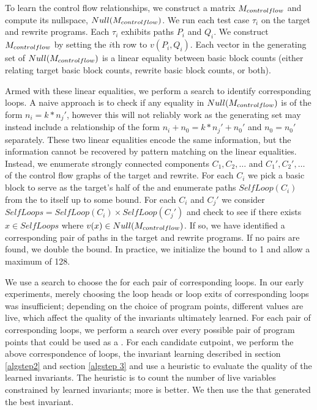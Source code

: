 To learn the control flow relationships, we construct a
matrix $M_{controlflow}$ and compute its nullspace,
$Null(M_{controlflow})$. We run each test case $\tau_i$ on
the target and rewrite programs. Each $\tau_i$ exhibits paths
$P_i$ and $Q_i$. We construct $M_{controlflow}$ by setting the
$i$th row to $v(P_i, Q_i)$. Each vector in the generating set of
$Null(M_{controlflow})$ is a linear equality between basic block
counts (either relating target basic block counts, rewrite basic block
counts, or both).

Armed with these linear equalities, we perform a search to identify
corresponding loops. A naive approach is to check if any equality
in $Null(M_{controlflow})$ is of the form $n_i = k*n_j'$,
however this will not reliably work as the generating set may instead
include a relationship of the form $n_i + n_0 = k*n_j' + n_0'$ and
$n_0 = n_0'$ separately. These two linear equalities encode the same
information, but the information cannot be recovered by pattern
matching on the linear equalities. Instead, we enumerate strongly
connected components $C_1, C_2, \dotsc$ and $C_1', C_2', \dotsc$ of
the control flow graphs of the target and rewrite. For each $C_i$ we
pick a basic block to serve as the target's half of the \cutpoint{}
and enumerate paths $SelfLoop(C_i)$ from the \cutpoint{} to itself
up to some bound. For each $C_i$ and $C_j'$ we consider $SelfLoops =
SelfLoop(C_i) \times SelfLoop(C_j')$ and check to see if there exists
$x \in SelfLoops$ where $v(x) \in Null(M_{controlflow})$. If
so, we have identified a corresponding pair of paths in the target
and rewrite programs. If no pairs are found, we double the bound. In
practice, we initialize the bound to 1 and allow a maximum of 128.

We use a search to choose the \cutpoint{} for each pair of
corresponding loops. In our early experiments, merely choosing the
loop heads or loop exits of corresponding loops was insufficient;
depending on the choice of program points, different values are live,
which affect the quality of the invariants ultimately learned. For
each pair of corresponding loops, we perform a search over every
possible pair of program points that could be used as a \cutpoint.
For each candidate cutpoint, we perform the above correspondence of
loops, the invariant learning described in section \ref{algstep2} and
section \ref{algstep 3} and use a heuristic to evaluate the quality of
the learned invariants. The heuristic is to count the number of live
variables constrained by learned invariants; more is better. We then
use the \cutpoint{} that generated the best invariant.

